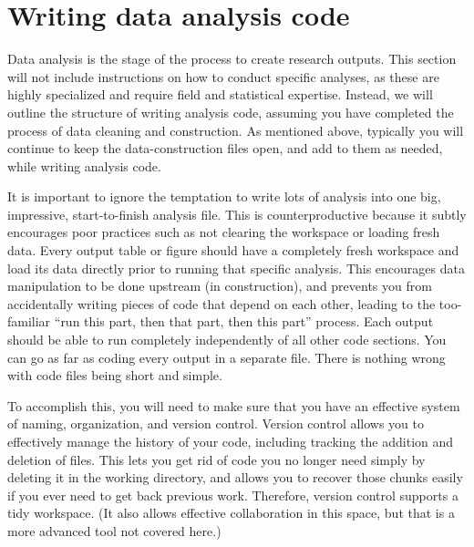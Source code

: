 
\section{Writing data analysis code}

Data analysis is the stage of the process to create research outputs.
This section will not include instructions on how to conduct specific analyses,
as these are highly specialized and require field and statistical expertise.
Instead, we will outline the structure of writing analysis code,
assuming you have completed the process of data cleaning and construction.
As mentioned above, typically you will continue to keep
the data-construction files open, and add to them as needed,
while writing analysis code.

It is important to ignore the temptation to write lots of analysis
into one big, impressive, start-to-finish analysis file.
This is counterproductive because it subtly encourages poor practices
such as not clearing the workspace or loading fresh data.
Every output table or figure should have
a completely fresh workspace and load its data directly
prior to running that specific analysis.
This encourages data manipulation to be done upstream (in construction),
and prevents you from accidentally writing pieces of code
that depend on each other, leading to the too-familiar
``run this part, then that part, then this part'' process.
Each output should be able to run completely independently
of all other code sections.
You can go as far as coding every output in a separate file.
There is nothing wrong with code files being short and simple.

To accomplish this, you will need to make sure that you
have an effective system of naming, organization, and version control.
Version control allows you to effectively manage the history of your code,
including tracking the addition and deletion of files.
This lets you get rid of code you no longer need
simply by deleting it in the working directory,
and allows you to recover those chunks easily
if you ever need to get back previous work.
Therefore, version control supports a tidy workspace.
(It also allows effective collaboration in this space,
but that is a more advanced tool not covered here.)

